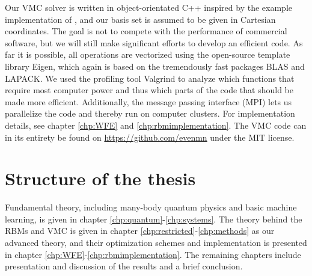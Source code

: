 Our VMC solver is written in object-orientated C++ inspired by the example implementation of \citet{ledum_simple_2016}, and our basis set is assumed to be given in Cartesian coordinates. The goal is not to compete with the performance of commercial software, but we will still make significant efforts to develop an efficient code. As far it is possible, all operations are vectorized using the open-source template library Eigen, which again is based on the tremendously fast packages BLAS and LAPACK. We used the profiling tool Valgrind to analyze which functions that require most computer power and thus which parts of the code that should be made more efficient. Additionally, the message passing interface (MPI) lets us parallelize the code and thereby run on computer clusters. For implementation details, see chapter \ref{chp:WFE} and \ref{chp:rbmimplementation}. The VMC code can in its entirety be found on \url{https://github.com/evenmn} under the MIT license. 

\section{Structure of the thesis}
Fundamental theory, including many-body quantum physics and basic machine learning, is given in chapter \ref{chp:quantum}-\ref{chp:systems}. The theory behind the RBMs and VMC is given in chapter \ref{chp:restricted}-\ref{chp:methods} as our advanced theory, and their optimization schemes and implementation is presented in chapter \ref{chp:WFE}-\ref{chp:rbmimplementation}. The remaining chapters include presentation and discussion of the results and a brief conclusion.
